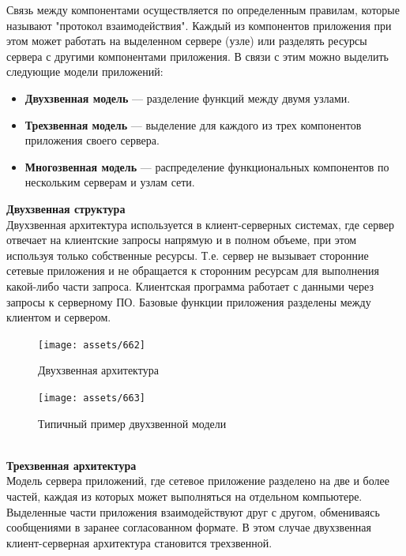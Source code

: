 Связь между компонентами осуществляется по определенным правилам, которые называют "протокол взаимодействия".
Каждый из компонентов приложения при этом может работать на выделенном сервере (узле) или разделять ресурсы сервера
с другими компонентами приложения. В связи с этим можно выделить следующие модели приложений:

\begin{itemize} 
    \item \textbf{Двухзвенная модель} — разделение функций между двумя узлами. 
    \item \textbf{Трехзвенная модель} — выделение для каждого из трех компонентов приложения своего сервера. 
    \item \textbf{Многозвенная модель} — распределение функциональных компонентов по нескольким серверам и узлам сети. \autocite{Tanenbaum}
\end{itemize}

\textbf{Двухзвенная структура}~\\

Двухзвенная архитектура используется в клиент-серверных системах, где сервер отвечает
на клиентские запросы напрямую и в полном объеме, при этом используя только
собственные ресурсы. Т.е. сервер не вызывает сторонние сетевые приложения и не
обращается к сторонним ресурсам для выполнения какой-либо части запроса. 
Клиентская программа работает с данными через запросы к серверному ПО. Базовые функции приложения разделены между клиентом и сервером.

\begin{figure}[H]
    \centering
    \texttt{[image: assets/662]}
    \caption{Двухзвенная архитектура}
\end{figure}

\begin{figure}[H]
    \centering
    \texttt{[image: assets/663]}
    \caption{Типичный пример двухзвенной модели}
\end{figure}~\\

\textbf{Трехзвенная архитектура}~\\

Модель сервера приложений, где сетевое приложение разделено на две и более частей, каждая из которых
может выполняться на отдельном компьютере. Выделенные части приложения
взаимодействуют друг с другом, обмениваясь сообщениями в заранее согласованном
формате. В этом случае двухзвенная клиент-серверная архитектура становится
трехзвенной. ~\\

